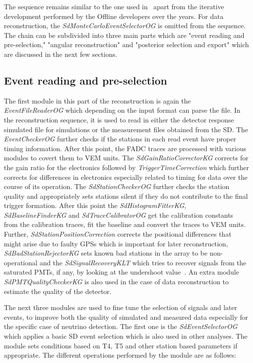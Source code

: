 The sequence remains similar to the one used in~\cite{gap_note_2013} apart from the iterative development performed by the Offline developers over the years. For data reconstruction, the \textit{SdMonteCarloEventSelectorOG} is omitted from the sequence. The chain can be subdivided into three main parts which are "event reading and pre-selection," "angular reconstruction" and "posterior selection and export" which are discussed in the next few sections.

\subsection{Event reading and pre-selection}
\label{subsec:reco_presel}

The first module in this part of the reconstruction is again the \textit{EventFileReaderOG} which depending on the input format can parse the file. In the reconstruction sequence, it is used to read in either the detector response simulated file for simulations or the measurement files obtained from the SD. The \textit{EventCheckerOG} further checks if the stations in each read event have proper timing information. After this point, the FADC traces are processed with various modules to covert them to VEM units. The \textit{SdGainRatioCorrectorKG} corrects for the gain ratio for the electronics followed by \textit{TriggerTimeCorrection} which further corrects for differences in electronics especially related to timing for data over the course of its operation. The \textit{SdStationCheckerOG} further checks the station quality and appropriately sets stations silent if they do not contribute to the final trigger formation. After this point the \textit{SdHistogramFitterKG}, \textit{SdBaselineFinderKG} and \textit{SdTraceCalibratorOG} get the calibration constants from the calibration traces, fit the baseline and convert the traces to VEM units. Further, \textit{SdStationPositionCorrection} corrects the positional differences that might arise due to faulty GPSs which is important for later reconstruction, \textit{SdBadStationRejectorKG} sets known bad stations in the array to be non-operational and the \textit{SdSignalRecoveryKLT} which tries to recover signals from the saturated PMTs, if any, by looking at the undershoot value~\cite{Veberic:2013suc,PierreAuger:2020yab}. An extra module \textit{SdPMTQualityCheckerKG} is also used in the case of data reconstruction to estimate the quality of the detector.

The next three modules are used to fine tune the selection of signals and later events, to improve both the quality of simulated and measured data especially for the specific case of neutrino detection. The first one is the \textit{SdEventSelectorOG} which applies a basic SD event selection which is also used in other analyses. The module sets conditions based on T4, T5 and other station based parameters if appropriate. The different operations performed by the module are as follows:


